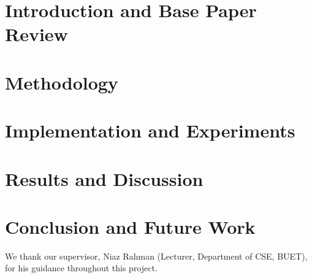 \documentclass[sigconf,nonacm]{acmart}
\begin{document}

\maketitle

\section{Introduction and Base Paper Review}
\label{sec:introduction}


\section{Methodology}
\label{sec:method}


\section{Implementation and Experiments}
\label{sec:impl}


\section{Results and Discussion}
\label{sec:results}


\section{Conclusion and Future Work}
\label{sec:conclusion}


\begin{acks}
We thank our supervisor, Niaz Rahman (Lecturer, Department of CSE, BUET),
for his guidance throughout this project.
\end{acks}




\appendix
\makeatletter
\def\kk@appendixprefix@section{Appendix~}%
\def\@seccntformat#1{%
  \ifcsname kk@appendixprefix@#1\endcsname\csname kk@appendixprefix@#1\endcsname\fi
  \csname the#1\endcsname\quad}
\makeatother

\end{document}
